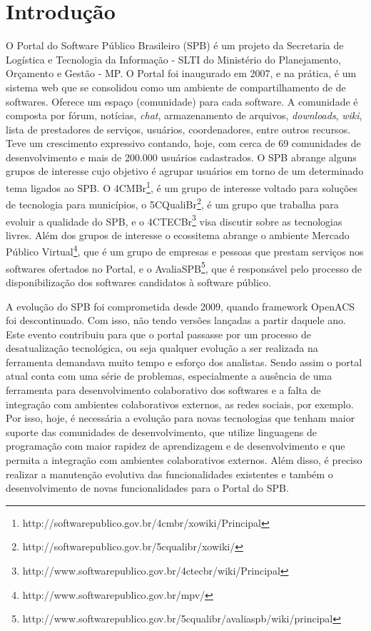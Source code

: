 \section{Introdução}
\label{sec:introducao}

O Portal do Software Público Brasileiro (SPB) é um projeto da Secretaria de Logística e Tecnologia da Informação - SLTI do Ministério do Planejamento, Orçamento e Gestão - MP. O Portal foi inaugurado em 2007, e na prática,
é um sistema web que se consolidou como um ambiente de compartilhamento de
de softwares. 
%
Oferece um espaço (comunidade) para cada software. A comunidade é composta por
fórum, notícias, {\it chat}, armazenamento de arquivos, {\it downloads}, {\it wiki}, lista de
prestadores de serviços, usuários, coordenadores, entre outros recursos.
%
Teve um crescimento expressivo contando, hoje, com cerca de 69 comunidades de
desenvolvimento e mais de 200.000 usuários cadastrados.
%
O SPB abrange alguns grupos de interesse cujo objetivo é agrupar usuários em torno de um determinado tema ligados ao SPB. O 4CMBr\footnote{http://softwarepublico.gov.br/4cmbr/xowiki/Principal}, é um grupo de interesse voltado para soluções
de tecnologia para municípios, o 5CQualiBr\footnote{http://softwarepublico.gov.br/5cqualibr/xowiki/}, é um grupo que trabalha para
evoluir a qualidade do SPB, e o 4CTECBr\footnote{http://www.softwarepublico.gov.br/4ctecbr/wiki/Principal} visa discutir sobre as tecnologias livres.
%
Além dos grupos de interesse o ecossitema abrange o ambiente Mercado Público Virtual\footnote{http://www.softwarepublico.gov.br/mpv/}, que é um
grupo de empresas e pessoas que prestam serviços nos softwares ofertados no
Portal, e o AvaliaSPB\footnote{http://www.softwarepublico.gov.br/5cqualibr/avaliaspb/wiki/principal}, que é responsável pelo processo de disponibilização dos softwares candidatos à software
público.
%

A evolução do SPB foi comprometida desde 2009, quando framework OpenACS foi 
descontinuado. Com isso, não tendo versões lançadas a partir daquele ano.
%
Este evento contribuiu para que o portal passasse por um processo de desatualização tecnológica, ou seja qualquer evolução a ser realizada na ferramenta demandava muito tempo e esforço dos analistas. Sendo assim o portal atual conta com uma série de problemas, especialmente a ausência de uma ferramenta para desenvolvimento colaborativo dos softwares e a falta de integração com ambientes colaborativos
externos, as redes sociais, por exemplo.
Por isso, hoje, é necessária a evolução para novas tecnologias que tenham maior
suporte das comunidades de desenvolvimento, que utilize linguagens de programação
com maior rapidez de aprendizagem e de desenvolvimento e que permita a integração
com ambientes colaborativos externos.
%
Além disso, é preciso realizar a manutenção evolutiva das funcionalidades
existentes e também o desenvolvimento de novas funcionalidades para o Portal
do SPB.



